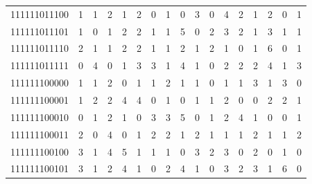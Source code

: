 \documentclass[10pt,a4paper]{article}
\begin{document}
\begin{longtable}{ |c|c|c|c|c|c|c|c|c|c|c|c|c|c|c|c|c| }
    111111011100              & 1                            & 1                                & 2                            & 1                              & 2   & 0   & 1   & 0   & 3   & 0   & 4   & 2   & 1   & 2   & 0   & 1   \\
    111111011101              & 1                            & 0                                & 1                            & 2                              & 2   & 1   & 1   & 5   & 0   & 2   & 3   & 2   & 1   & 3   & 1   & 1   \\
    111111011110              & 2                            & 1                                & 1                            & 2                              & 2   & 1   & 1   & 2   & 1   & 2   & 1   & 0   & 1   & 6   & 0   & 1   \\
    111111011111              & 0                            & 4                                & 0                            & 1                              & 3   & 3   & 1   & 4   & 1   & 0   & 2   & 2   & 2   & 4   & 1   & 3   \\
    111111100000              & 1                            & 1                                & 2                            & 0                              & 1   & 1   & 2   & 1   & 1   & 0   & 1   & 1   & 3   & 1   & 3   & 0   \\
    111111100001              & 1                            & 2                                & 2                            & 4                              & 4   & 0   & 1   & 0   & 1   & 1   & 2   & 0   & 0   & 2   & 2   & 1   \\
    111111100010              & 0                            & 1                                & 2                            & 1                              & 0   & 3   & 3   & 5   & 0   & 1   & 2   & 4   & 1   & 0   & 0   & 1   \\
    111111100011              & 2                            & 0                                & 4                            & 0                              & 1   & 2   & 2   & 1   & 2   & 1   & 1   & 1   & 2   & 1   & 1   & 2   \\
    111111100100              & 3                            & 1                                & 4                            & 5                              & 1   & 1   & 1   & 0   & 3   & 2   & 3   & 0   & 2   & 0   & 1   & 0   \\
    111111100101              & 3                            & 1                                & 2                            & 4                              & 1   & 0   & 2   & 4   & 1   & 0   & 3   & 2   & 3   & 1   & 6   & 0   \\

\end{longtable}
\end{document}
